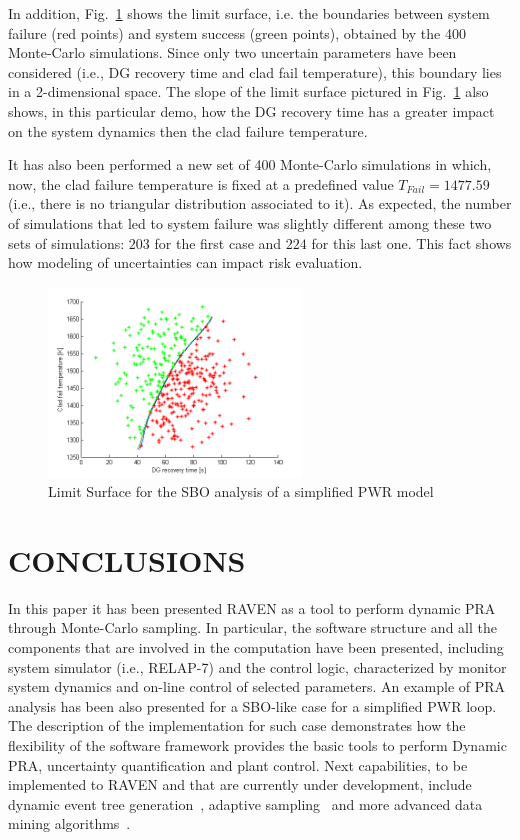 \documentclass{mc2013}
\begin{document}
In addition, Fig.~\ref{fig:limit_surface_rng_temp_and_dg} shows the limit surface, i.e. the boundaries between system failure (red points) and system success (green points), obtained by the 400 Monte-Carlo simulations. Since only two uncertain parameters have been considered (i.e., DG recovery time and clad fail temperature), this boundary lies in a 2-dimensional space.
The slope of the limit surface pictured in Fig.~\ref{fig:limit_surface_rng_temp_and_dg} also shows, in this particular demo, how the DG recovery time has a greater impact on the system dynamics then the clad failure temperature.

It has also been performed a new set of 400 Monte-Carlo simulations in which, now, the clad failure temperature is fixed at a predefined value $T_{Fail}=1477.59$ (i.e., there is no triangular distribution associated to it). As expected, the number of simulations that led to system failure was slightly different among these two sets of simulations: $203$ for the first case and $224$ for this last one.
 This fact shows how modeling of uncertainties can impact risk evaluation.

\begin{figure}[h]
   \centering
    \includegraphics[width=0.6\textwidth]{figures/PRA_limitSurface.png}
    \caption{Limit Surface for the SBO analysis of a simplified PWR model}
    \label{fig:limit_surface_rng_temp_and_dg}
\end{figure}
\section{CONCLUSIONS}
In this paper it has been presented RAVEN as a tool to perform dynamic PRA through Monte-Carlo sampling. In particular, the software structure and all the components that are involved in the computation have been presented, including system simulator (i.e., RELAP-7) and the control logic, characterized by monitor system dynamics and on-line control of selected parameters.
An example of PRA analysis has been also presented for a SBO-like case for a simplified PWR loop. 
The description of the implementation for such case demonstrates how the flexibility of the software framework provides the basic tools to perform Dynamic PRA, uncertainty quantification and plant control. 
Next capabilities, to be implemented to RAVEN and that are currently under development, include dynamic event tree generation~\cite{ADAPTHakobyan}, adaptive sampling~\cite{mandelliSVMANS} and more advanced data mining algorithms~\cite{mandelliEsrel2011}. 
\end{document}
